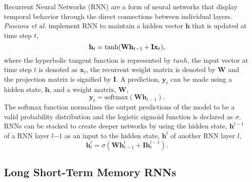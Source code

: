 \documentclass[preprint,12pt,3p]{elsarticle}
\begin{document}
Recurrent Neural Networks (RNN) are a form of neural networks that display temporal behavior through the direct connections between individual layers.  \textit{Pascanu et al.} \cite{pascanu2013construct} implement RNN to maintain a hidden vector $\mathbf h$ that is updated at time step $t$,
\begin{equation}
	\mathbf h_t = \tanh(\mathbf W\mathbf h_{t-1} + \mathbf I\mathbf  \x_t),
\end{equation}
where the hyperbolic tangent function is represented by $tanh$, the input vector at time step $t$ is denoted as $\mathbf x_t$, the recurrent weight matrix is denoted by $\mathbf W$ and the projection matrix is signified by $\mathbf I$. A prediction, $\mathbf y_t$ can be made using a hidden state,  $\mathbf h$, and a weight matrix, $\mathbf W$,
\begin{equation}
	\mathbf y_t = \text{softmax}(\mathbf W\mathbf h_{t-1}).
\end{equation}
The softmax function normalizes the output predictions of the model to be a valid probability distribution and the logistic sigmoid function is declared as $\sigma$. RNNs can be stacked to create deeper networks by using the hidden state,  $\mathbf h^{l-1}$ of a RNN layer $l{-1}$ as an input to the hidden state, $\mathbf h^l$ of another RNN layer $l$, 
\begin{equation}
	\mathbf h_t^{l} = \sigma(\mathbf W\mathbf h_{t-1}^{l} + \mathbf I\mathbf h_t^{l-1}).
\end{equation}

\subsection{Long Short-Term Memory RNNs}
\def\x{{\mathbf x}}
\end{document}
